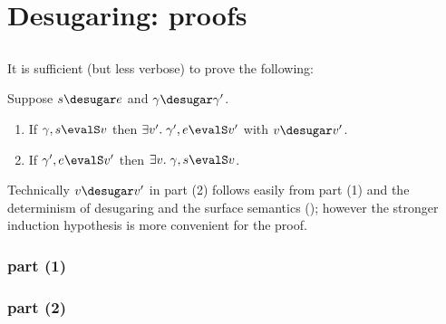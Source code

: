 \section{Desugaring: proofs}

\subsection{}
\label{app:proofs:close-defs-eq}
\setcounter{equation}{0}


\subsection{}
\label{app:proofs:match-seq-eq}
\setcounter{equation}{0}


\subsection{}
\label{app:proofs:semantics-eq}

It is sufficient (but less verbose) to prove the following:
\begin{theorem}
   \label{thm:app:proofs:semantics-eq}
   Suppose $s \desugar e$ and $\gamma \desugar \gamma'$.
   \begin{enumerate}
      \item If $\gamma, s \evalS v$ then $\exists v'.\;\gamma', e \evalS v'$ with $v \desugar v'$.
      \item If $\gamma', e \evalS v'$ then $\exists v.\;\gamma, s \evalS v$.
   \end{enumerate}
\end{theorem}

\noindent Technically $v \desugar v'$ in part (2) follows easily from part (1) and the determinism of
desugaring and the surface semantics
(); however the stronger induction
hypothesis is more convenient for the proof.

\subsubsection{ part (1)}
\setcounter{equation}{0}


\subsubsection{ part (2)}
\setcounter{equation}{0}


